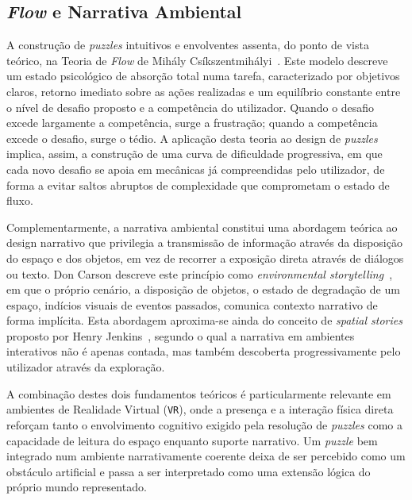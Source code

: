 \documentclass[a4paper, 12pt]{book}
\begin{document}
\subsection{\textit{Flow} e Narrativa Ambiental}
\label{subsec:puzzles_narrativa}
A construção de \textit{puzzles} intuitivos e envolventes assenta, do ponto de 
vista teórico, na Teoria de \textit{Flow} de Mihály Csíkszentmihályi~\cite{flow}. Este modelo 
descreve um estado psicológico de absorção total numa tarefa, caracterizado 
por objetivos claros, retorno imediato sobre as ações realizadas e um 
equilíbrio constante entre o nível de desafio proposto e a competência do 
utilizador. Quando o desafio excede largamente a competência, surge a 
frustração; quando a competência excede o desafio, surge o tédio. A 
aplicação desta teoria ao design de \textit{puzzles} implica, assim, a construção de 
uma curva de dificuldade progressiva, em que cada novo desafio se apoia em 
mecânicas já compreendidas pelo utilizador, de forma a evitar saltos abruptos de 
complexidade que comprometam o estado de fluxo.
\par
Complementarmente, a narrativa ambiental constitui uma abordagem teórica ao 
design narrativo que privilegia a transmissão de informação através da 
disposição do espaço e dos objetos, em vez de recorrer a exposição direta 
através de diálogos ou texto. Don Carson descreve este princípio como 
\newline\textit{environmental storytelling}~\cite{env_story}, em que o próprio cenário, a 
disposição de objetos, o estado de degradação de um espaço, indícios 
visuais de eventos passados, comunica contexto narrativo de forma 
implícita. Esta abordagem aproxima-se ainda do conceito de \textit{spatial 
stories} proposto por \newline Henry Jenkins~\cite{spatial_stories}, segundo o qual 
a narrativa em ambientes 
interativos não é apenas contada, mas também descoberta progressivamente 
pelo utilizador através da exploração.
\par
A combinação destes dois fundamentos teóricos é particularmente relevante 
em ambientes de Realidade Virtual (\texttt{VR}), onde a presença e a interação física 
direta reforçam tanto o envolvimento cognitivo exigido pela resolução de 
\textit{puzzles} como a capacidade de leitura do espaço enquanto suporte narrativo. 
Um \textit{puzzle} bem integrado num ambiente narrativamente coerente deixa de ser 
percebido como um obstáculo artificial e passa a ser interpretado como uma 
extensão lógica do próprio mundo representado.
\par
\end{document}
